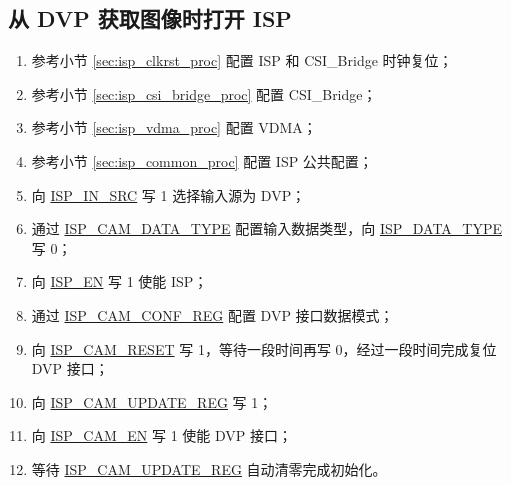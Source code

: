 \documentclass[main\_\_CN.tex]{subfiles}
\begin{document}
\subsection{从 DVP 获取图像时打开 ISP}
\begin{enumerate}
    \item 参考小节 \ref{sec:isp_clkrst_proc} 配置 ISP 和 CSI\_Bridge 时钟复位；

    \item 参考小节 \ref{sec:isp_csi_bridge_proc} 配置 CSI\_Bridge；

    \item 参考小节 \ref{sec:isp_vdma_proc} 配置 VDMA；

    \item 参考小节 \ref{sec:isp_common_proc} 配置 ISP 公共配置；

    \item 向 \hyperref[fielddesc:ISPINSRC]{ISP\_IN\_SRC} 写 1 选择输入源为 DVP；

    \item 通过 \hyperref[fielddesc:ISPCAMDATATYPE]{ISP\_CAM\_DATA\_TYPE} 配置输入数据类型，向 \hyperref[fielddesc:ISPDATATYPE]{ISP\_DATA\_TYPE} 写 0；

    \item 向 \hyperref[fielddesc:ISPEN]{ISP\_EN} 写 1 使能 ISP；

    \item 通过 \hyperref[regdesc:ISPCAMCONFREG]{ISP\_CAM\_CONF\_REG} 配置 DVP 接口数据模式；

    \item 向 \hyperref[fielddesc:ISPCAMRESET]{ISP\_CAM\_RESET} 写 1，等待一段时间再写 0，经过一段时间完成复位 DVP 接口；

    \item 向 \hyperref[fielddesc:ISPCAMUPDATEREG]{ISP\_CAM\_UPDATE\_REG} 写 1；

    \item 向 \hyperref[fielddesc:ISPCAMEN]{ISP\_CAM\_EN} 写 1 使能 DVP 接口；

    \item 等待 \hyperref[fielddesc:ISPCAMUPDATEREG]{ISP\_CAM\_UPDATE\_REG} 自动清零完成初始化。
\end{enumerate}
\end{document}
